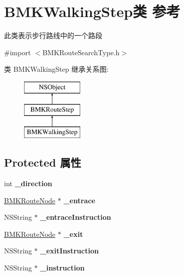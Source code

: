 \hypertarget{interface_b_m_k_walking_step}{}\section{B\+M\+K\+Walking\+Step类 参考}
\label{interface_b_m_k_walking_step}


此类表示步行路线中的一个路段  




{\ttfamily \#import $<$B\+M\+K\+Route\+Search\+Type.\+h$>$}

类 B\+M\+K\+Walking\+Step 继承关系图\+:\begin{figure}[H]
\begin{center}
\leavevmode
\includegraphics[height=3.000000cm]{interface_b_m_k_walking_step}
\end{center}
\end{figure}
\subsection*{Protected 属性}
\begin{DoxyCompactItemize}
\item 
\hypertarget{interface_b_m_k_walking_step_ae228d2fcf96f0b45fb8d88c90ac0a36b}{}int {\bfseries \+\_\+direction}\label{interface_b_m_k_walking_step_ae228d2fcf96f0b45fb8d88c90ac0a36b}

\item 
\hypertarget{interface_b_m_k_walking_step_a50b8d5a16a9646d5843e9b8151f72486}{}\hyperlink{interface_b_m_k_route_node}{B\+M\+K\+Route\+Node} $\ast$ {\bfseries \+\_\+entrace}\label{interface_b_m_k_walking_step_a50b8d5a16a9646d5843e9b8151f72486}

\item 
\hypertarget{interface_b_m_k_walking_step_ade12c451bf711b1968ecd28e85db181b}{}N\+S\+String $\ast$ {\bfseries \+\_\+entrace\+Instruction}\label{interface_b_m_k_walking_step_ade12c451bf711b1968ecd28e85db181b}

\item 
\hypertarget{interface_b_m_k_walking_step_a7d8595edf38ee9af73fe67343ff2ac9c}{}\hyperlink{interface_b_m_k_route_node}{B\+M\+K\+Route\+Node} $\ast$ {\bfseries \+\_\+exit}\label{interface_b_m_k_walking_step_a7d8595edf38ee9af73fe67343ff2ac9c}

\item 
\hypertarget{interface_b_m_k_walking_step_a8f2654311c041ee72797647ddb53051b}{}N\+S\+String $\ast$ {\bfseries \+\_\+exit\+Instruction}\label{interface_b_m_k_walking_step_a8f2654311c041ee72797647ddb53051b}

\item 
\hypertarget{interface_b_m_k_walking_step_a9291db23fb101adb768986b2ed806894}{}N\+S\+String $\ast$ {\bfseries \+\_\+instruction}\label{interface_b_m_k_walking_step_a9291db23fb101adb768986b2ed806894}

\end{DoxyCompactItemize}
